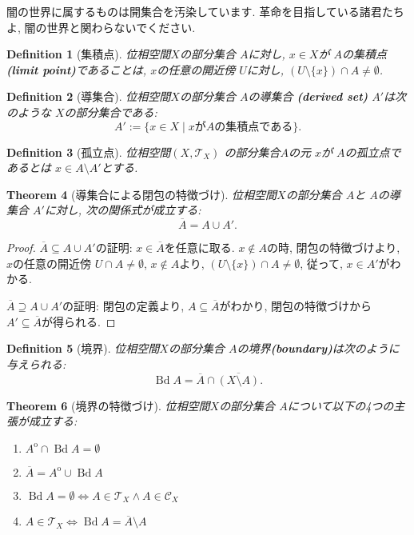 \documentclass[dvipdfmx]{jbook}
\newcommand{\cl}[1]{\overline{ #1}  }
\newcommand{\Int}[1]{#1 ^{\mathrm{o}} }
\newcommand{\bd}[1]{\operatorname{Bd}{#1}}
\newtheorem{theorem}{Theorem}[section]
\newtheorem{definition}[theorem]{Definition}
\theoremstyle{remark}
\theoremstyle{plain}
\begin{document}
闇の世界に属するものは開集合を汚染しています. 革命を目指している諸君たちよ, 闇の世界と関わらないでください.

\begin{definition}[集積点]
	位相空間$X$の部分集合 $A$に対し,  $x \in X$が $A$の集積点\textbf{(limit point)}であることは,
$x$の任意の開近傍 $U$に対し,  $\left( U\setminus \{x\}  \right) \cap A \neq \emptyset $.
\end{definition}

\begin{definition}[導集合]
	位相空間$X$の部分集合 $A$の導集合 \textbf{(derived set)} $A'$は次のような $X$の部分集合である:
	 \[
	A' := \{x \in X  \mid  x がAの集積点である\} 
	.\] 
\end{definition}

\begin{definition}[孤立点]
	位相空間$\left( X , \mathcal{T}_{X} \right)$ の部分集合$A$の元 $x$が $A$の孤立点であるとは $x \in  A\setminus A'$とする.
\end{definition}

\begin{theorem}[導集合による閉包の特徴づけ]
	位相空間$X$の部分集合 $A$と $A$の導集合 $A'$に対し, 次の関係式が成立する:
	\[
	\cl{A} = A \cup A'
	.\] 
\end{theorem}

\begin{proof}
	$\cl{A} \subseteq A \cup A'$の証明:  $x \in \cl{A}$を任意に取る.  
	$x \not\in  A $の時, 閉包の特徴づけより, $x$の任意の開近傍 $U \cap A \neq \emptyset$, $x \not\in  A$より, $\left( U \setminus \{x\}  \right) \cap A \neq \emptyset $, 従って, $x \in A'$がわかる.

	 $\cl{A} \supseteq A \cup A'$の証明: 閉包の定義より,  $A \subseteq \cl{A}$がわかり, 閉包の特徴づけから $A' \subseteq \cl{A}$が得られる.

\end{proof}

\begin{definition}[境界]
	位相空間$X$の部分集合 $A$の境界\textbf{(boundary)}は次のように与えられる:
	\[
	\bd{A}= \cl{A} \cap \cl{(X\setminus A)}
	.\] 
\end{definition}

\begin{theorem}[境界の特徴づけ]
	位相空間$X$の部分集合 $A$について以下の4つの主張が成立する: 
	 \begin{enumerate}
		\item $\Int{A} \cap \bd{A} = \emptyset$
		\item $\cl{A} = \Int{A} \cup \bd{A}$
		\item  $\bd{A} = \emptyset \iff A \in \mathcal{T}_X \land A \in \mathcal{C}_X$
	\item $A \in \mathcal{T}_X \iff \bd{A} = \cl{A} \setminus A $
	\end{enumerate}
\end{theorem}
\end{document}
